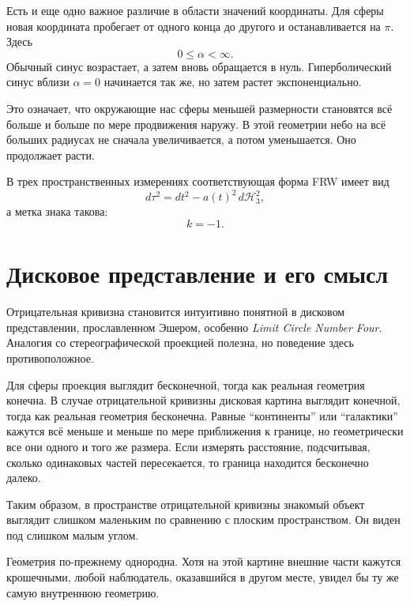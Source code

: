 Есть и еще одно важное различие в области значений координаты. Для сферы новая координата пробегает от одного конца до другого и останавливается на \(\pi\). Здесь
\begin{equation}
0\leq \alpha<\infty.
\end{equation}
Обычный синус возрастает, а затем вновь обращается в нуль. Гиперболический синус вблизи \(\alpha=0\) начинается так же, но затем растет экспоненциально.

Это означает, что окружающие нас сферы меньшей размерности становятся всё больше и больше по мере продвижения наружу. В этой геометрии небо на всё больших радиусах не сначала увеличивается, а потом уменьшается. Оно продолжает расти.

В трех пространственных измерениях соответствующая форма FRW имеет вид
\begin{equation}
d\tau^2=dt^2-a(t)^2\,d\mathcal H_3^2,
\end{equation}
а метка знака такова:
\begin{equation}
k=-1.
\end{equation}

\section{Дисковое представление и его смысл}

Отрицательная кривизна становится интуитивно понятной в дисковом представлении, прославленном Эшером, особенно \emph{Limit Circle Number Four}. Аналогия со стереографической проекцией полезна, но поведение здесь противоположное.

Для сферы проекция выглядит бесконечной, тогда как реальная геометрия конечна. В случае отрицательной кривизны дисковая картина выглядит конечной, тогда как реальная геометрия бесконечна. Равные ``континенты'' или ``галактики'' кажутся всё меньше и меньше по мере приближения к границе, но геометрически все они одного и того же размера. Если измерять расстояние, подсчитывая, сколько одинаковых частей пересекается, то граница находится бесконечно далеко.

Таким образом, в пространстве отрицательной кривизны знакомый объект выглядит слишком маленьким по сравнению с плоским пространством. Он виден под слишком малым углом.

Геометрия по-прежнему однородна. Хотя на этой картине внешние части кажутся крошечными, любой наблюдатель, оказавшийся в другом месте, увидел бы ту же самую внутреннюю геометрию.


